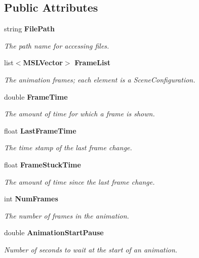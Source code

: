 \subsection*{Public Attributes}
\begin{CompactItemize}
\item 
string {\bf File\-Path}
\begin{CompactList}\small\item\em The path name for accessing files.\item\end{CompactList}\item 
list$<${\bf MSLVector}$>$ {\bf Frame\-List}
\begin{CompactList}\small\item\em The animation frames; each element is a Scene\-Configuration.\item\end{CompactList}\item 
double {\bf Frame\-Time}
\begin{CompactList}\small\item\em The amount of time for which a frame is shown.\item\end{CompactList}\item 
float {\bf Last\-Frame\-Time}
\begin{CompactList}\small\item\em The time stamp of the last frame change.\item\end{CompactList}\item 
float {\bf Frame\-Stuck\-Time}
\begin{CompactList}\small\item\em The amount of time since the last frame change.\item\end{CompactList}\item 
int {\bf Num\-Frames}
\begin{CompactList}\small\item\em The number of frames in the animation.\item\end{CompactList}\item 
double {\bf Animation\-Start\-Pause}
\begin{CompactList}\small\item\em Number of seconds to wait at the start of an animation.\item\end{CompactList}\item 

\end{CompactItemize}
